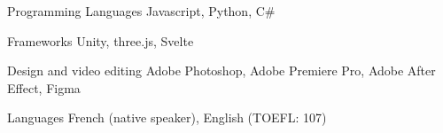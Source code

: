 

\begin{cvskills}

  \cvskill
    {Programming Languages} %
    {Javascript, Python, C\#} %

  \cvskill
    {Frameworks} %
    {Unity, three.js, Svelte} %
    

  \cvskill
    {Design and video editing} %
    {Adobe Photoshop, Adobe Premiere Pro, Adobe After Effect, Figma} %

  \cvskill
    {Languages} %
    {French (native speaker), English (TOEFL: 107)} %

\end{cvskills}
